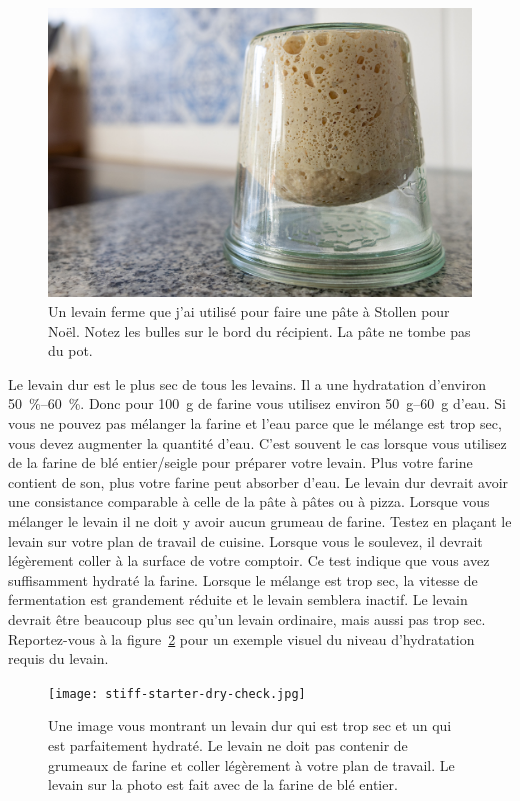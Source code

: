 \begin{figure}[!htb]
  \includegraphics[width=\textwidth]{sourdough-starter-stiff.jpg}
  \caption[Levain ferme à l'envers]{Un levain ferme que j'ai utilisé pour faire une pâte à Stollen pour Noël. Notez les bulles sur le bord du récipient. La pâte ne tombe pas du pot.}
  \label{fig:levain-ferme-sourdough-starter}
\end{figure}Le levain dur est le plus sec de tous les levains. Il a une hydratation
d'environ \qtyrange{50}{60}{\percent}. Donc pour \qty{100}{\gram} de farine vous utilisez environ
\qtyrange{50}{60}{\gram} d'eau. Si vous ne pouvez pas mélanger la farine et l'eau parce que le
mélange est trop sec, vous devez augmenter la quantité d'eau. C'est souvent
le cas lorsque vous utilisez de la farine de blé entier/seigle pour préparer votre levain. Plus
votre farine contient de son, plus votre farine peut absorber d'eau. Le levain dur
devrait avoir une consistance comparable à celle de la pâte à pâtes ou à pizza. Lorsque
vous mélanger le levain il ne doit y avoir aucun grumeau de farine. Testez en plaçant
le levain sur votre plan de travail de cuisine. Lorsque vous le soulevez, il devrait légèrement coller
à la surface de votre comptoir. Ce test indique que vous avez suffisamment hydraté la farine.
Lorsque le mélange est trop sec, la vitesse de fermentation est grandement réduite et
le levain semblera inactif. Le levain devrait être beaucoup plus sec
qu'un levain ordinaire, mais aussi pas trop sec. Reportez-vous à la figure~\ref{fig:stiff-starter-dry-check}
pour un exemple visuel du niveau d'hydratation requis du levain. 

\begin{figure}[!htb]
  \texttt{[image: stiff-starter-dry-check.jpg]}
  \caption[Un levain trop sec et parfaitement hydraté]{Une image vous montrant un
      levain dur qui est trop sec et un qui est parfaitement hydraté. Le
      levain ne doit pas contenir de grumeaux de farine et coller légèrement à votre
      plan de travail. Le levain sur la photo est fait avec de la farine de blé entier.}%
  \label{fig:stiff-starter-dry-check}
\end{figure}

